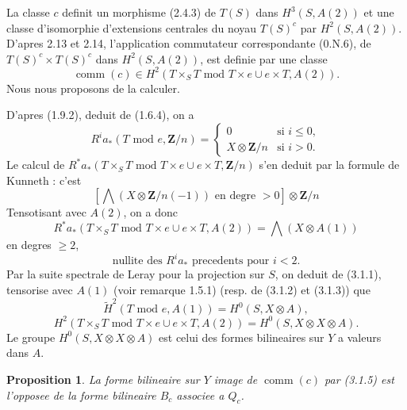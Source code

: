 \documentclass[11pt,a4paper]{article}
\theoremstyle{plain}
\newtheorem{proposition}[theorem]{Proposition}
\theoremstyle{definition}
\DeclareMathOperator{\comm}{comm}
\begin{document}
La classe $c$ definit un morphisme (2.4.3) de $T(S)$ dans $H^3(S, A(2))$ et une classe d'isomorphie d'extensions centrales du noyau $T(S)^c$ par $H^2(S, A(2))$. D'apres 2.13 et 2.14, l'application commutateur correspondante (0.N.6), de $T(S)^c \times T(S)^c$ dans $H^2(S, A(2))$, est definie par une classe
\[
\comm(c) \in H^2(T \times_S T \text{ mod } T \times e \cup e \times T, A(2)).
\]
Nous nous proposons de la calculer.

D'apres (1.9.2), deduit de (1.6.4), on a
\begin{equation}\label{3.1.1}
R^i a_*(T \text{ mod } e, \mathbf{Z}/n) =
\begin{cases}
0 & \text{si } i \leq 0, \\
X \otimes \mathbf{Z}/n & \text{si } i > 0.
\end{cases}
\end{equation}
Le calcul de $R^* a_*(T \times_S T \text{ mod } T \times e \cup e \times T, \mathbf{Z}/n)$ s'en deduit par la formule de Kunneth : c'est
\[
[\bigwedge(X \otimes \mathbf{Z}/n(-1)) \text{ en degre } > 0] \otimes \mathbf{Z}/n
\]
Tensotisant avec $A(2)$, on a donc
\begin{equation}\label{3.1.2}
R^* a_*(T \times_S T \text{ mod } T \times e \cup e \times T, A(2)) = \bigwedge(X \otimes A(1))
\end{equation}
en degres $\geq 2$,
\begin{equation}\label{3.1.3}
\text{nullite des } R^i a_* \text{ precedents pour } i < 2.
\end{equation}
Par la suite spectrale de Leray pour la projection sur $S$, on deduit de (3.1.1), tensorise avec $A(1)$ (voir remarque 1.5.1) (resp. de (3.1.2) et (3.1.3)) que
\begin{equation}\label{3.1.4}
\widetilde{H}^2(T \text{ mod } e, A(1)) = H^0(S, X \otimes A),
\end{equation}
\begin{equation}\label{3.1.5}
H^2(T \times_S T \text{ mod } T \times e \cup e \times T, A(2)) = H^0(S, X \otimes X \otimes A).
\end{equation}
Le groupe $H^0(S, X \otimes X \otimes A)$ est celui des formes bilineaires sur $Y$ a valeurs dans $A$.

\begin{proposition}\label{3.2}
La forme bilineaire sur $Y$ image de $\comm(c)$ par (3.1.5) est l'opposee de la forme bilineaire $B_c$ associee a $Q_c$.
\end{proposition}
\end{document}
